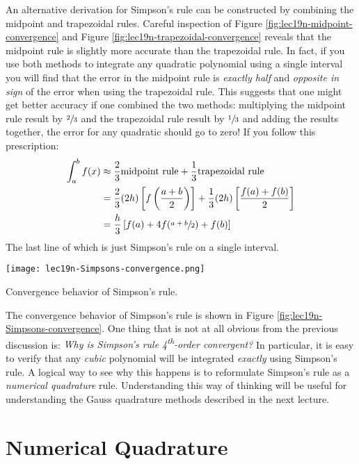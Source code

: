 An alternative derivation for Simpson's rule can be constructed by combining the midpoint and trapezoidal rules.  Careful inspection of Figure \ref{fig:lec19n-midpoint-convergence} and Figure \ref{fig:lec19n-trapezoidal-convergence} reveals that the midpoint rule is slightly more accurate than the trapezoidal rule. In fact, if you use both methods to integrate any quadratic polynomial using a single interval you will find that the error in the midpoint rule is \emph{exactly half} and \emph{opposite in sign} of the error when using the trapezoidal rule.  This suggests that one might get better accuracy if one combined the two methods: multiplying the midpoint rule result by $\sfrac{2}{3}$ and the trapezoidal rule result by $\sfrac{1}{3}$ and adding the results together, the error for any quadratic should go to zero!  If you follow this prescription:
\begin{align*}
\int_{a}^{b} f(x) &\approx \frac{2}{3} \text{midpoint rule} + \frac{1}{3} \text{trapezoidal rule} \\
&=\frac{2}{3} (2h)\left[f\left(\frac{a+b}{2}\right)\right]+\frac{1}{3}(2h)\left[\frac{f(a)+f(b)}{2}\right] \\
&=\frac{h}{3}\left[f(a) + 4f(\sfrac{a+b}{2})+f(b) \right]
\end{align*}
The last line of which is just Simpson's rule on a single interval.

\begin{marginfigure}
\texttt{[image: lec19n-Simpsons-convergence.png]}
\caption{Convergence behavior of Simpson's rule.}
\label{fig:lec19n-Simpsons-convergence}
\end{marginfigure}

The convergence behavior of Simpson's rule is shown in Figure \ref{fig:lec19n-Simpsons-convergence}. One thing that is not at all obvious from the previous discussion is: \emph{Why is Simpson's rule 4\textsuperscript{th}-order convergent?}  In particular, it is easy to verify that any \emph{cubic} polynomial will be integrated \emph{exactly} using Simpson's rule.  A logical way to see why this happens is to reformulate Simpson's rule as a \emph{numerical quadrature} rule.  Understanding this way of thinking will be useful for understanding the Gauss quadrature methods described in the next lecture.

\section{Numerical Quadrature}

